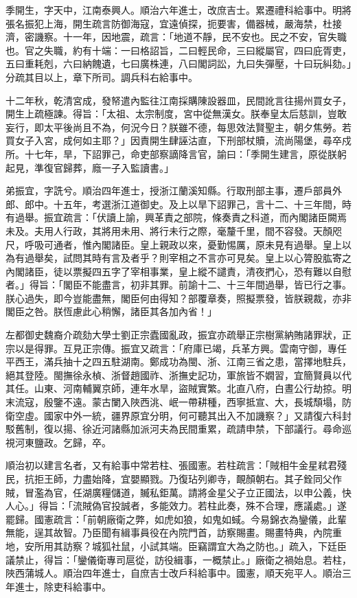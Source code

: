 \begin{pinyinscope}
季開生，字天中，江南泰興人。順治六年進士，改庶吉士。累遷禮科給事中。明將張名振犯上海，開生疏言防御海寇，宜遠偵探，扼要害，備器械，嚴海禁，杜接濟，密譏察。十一年，因地震，疏言：「地道不靜，民不安也。民之不安，官失職也。官之失職，約有十端：一曰格詔旨，二曰輕民命，三曰縱屬官，四曰庇胥吏，五曰重耗剋，六曰納餽遺，七曰廣株連，八曰閣詞訟，九曰失彈壓，十曰玩糾劾。」分疏其目以上，章下所司。調兵科右給事中。

十二年秋，乾清宮成，發帑遣內監往江南採購陳設器皿，民間訛言往揚州買女子，開生上疏極諫。得旨：「太祖、太宗制度，宮中從無漢女。朕奉皇太后慈訓，豈敢妄行，即太平後尚且不為，何況今日？朕雖不德，每思效法賢聖主，朝夕焦勞。若買女子入宮，成何如主耶？」因責開生肆誣沽直，下刑部杖贖，流尚陽堡，尋卒戍所。十七年，旱，下詔罪己，命吏部察謫降言官，諭曰：「季開生建言，原從朕躬起見，準復官歸葬，廕一子入監讀書。」

弟振宜，字詵兮。順治四年進士，授浙江蘭溪知縣。行取刑部主事，遷戶部員外郎、郎中。十五年，考選浙江道御史。及上以旱下詔罪己，言十二、十三年間，時有過舉。振宜疏言：「伏讀上諭，興革責之部院，條奏責之科道，而內閣諸臣闕焉未及。夫用人行政，其將用未用、將行未行之際，毫釐千里，間不容發。天顏咫尺，呼吸可通者，惟內閣諸臣。皇上親政以來，憂勤惕厲，原未見有過舉。皇上以為有過舉矣，試問其時有言及者乎？則宰相之不言亦可見矣。皇上以心膂股肱寄之內閣諸臣，徒以票擬四五字了宰相事業，皇上縱不譴責，清夜捫心，恐有難以自慰者。」得旨：「閣臣不能盡言，初非其罪。前諭十二、十三年間過舉，皆已行之事。朕心過失，即今豈能盡無，閣臣何由得知？部覆章奏，照擬票發，皆朕親裁，亦非閣臣之咎。朕恆慮此心稍懈，諸臣其各加內省！」

左都御史魏裔介疏劾大學士劉正宗蠹國亂政，振宜亦疏舉正宗樹黨納賄諸罪狀，正宗以是得罪。互見正宗傳。振宜又疏言：「府庫已竭，兵革方興。雲南守御，專任平西王，滿兵抽十之四五駐湖南。鄭成功為閩、浙、江南三省之患，當擇地駐兵，絕其登陸。閩撫徐永楨、浙督趙國祚、浙撫史記功，軍旅皆不嫺習，宜簡賢員以代其任。山東、河南輔翼京師，連年水旱，盜賊實繁。北直八府，白晝公行劫掠。明末流寇，殷鑒不遠。蒙古闌入陜西洮、岷一帶耕種，西寧抵宣、大，長城頹塌，防衛空虛。國家中外一統，疆界原宜分明，何可聽其出入不加譏察？」又請復六科封駁舊制，復以揚、徐近河諸縣加派河夫為民間重累，疏請申禁，下部議行。尋命巡視河東鹽政。乞歸，卒。

順治初以建言名者，又有給事中常若柱、張國憲。若柱疏言：「賊相牛金星弒君殘民，抗拒王師，力盡始降，宜嬰顯戮。乃復玷列卿寺，靦顏朝右。其子銓同父作賊，冒濫為官，任湖廣糧儲道，贓私鉅萬。請將金星父子立正國法，以申公義，快人心。」得旨：「流賊偽官投誠者，多能效力。若柱此奏，殊不合理，應議處。」遂罷歸。國憲疏言：「前朝廠衛之弊，如虎如狼，如鬼如蜮。今易錦衣為鑾儀，此輩無能，逞其故智。乃臣聞有緝事員役在內院門首，訪察賜畫。賜畫特典，內院重地，安所用其訪察？城狐社鼠，小試其端。臣竊謂宜大為之防也。」疏入，下廷臣議禁止，得旨：「鑾儀衛專司扈從，訪役緝事，一概禁止。」廠衛之禍始息。若柱，陜西蒲城人。順治四年進士，自庶吉士改戶科給事中。國憲，順天宛平人。順治三年進士，除吏科給事中。


\end{pinyinscope}
